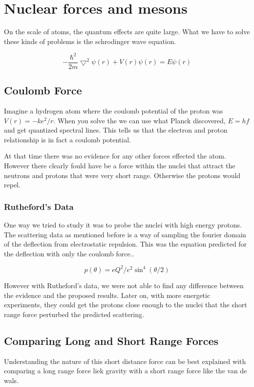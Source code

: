 \documentclass[english, 11pt]{article}
\begin{document}
      \section{Nuclear forces and mesons}

      On the scale of atoms, the quantum effects are quite large. What we have to solve these kinds of problems is the schrodinger wave equation.

      \begin{defn}\label{swe}
        \[ -\frac{\hbar^2}{2m}\bigtriangledown^2\psi(r) + V(r)\psi(r) = E\psi(r) \]
      \end{defn}

      \subsection{Coulomb Force}
        Imagine a hydrogen atom where the coulomb potential of the proton was $V(r) = -ke^2/r$. When you solve the  we can use what Planck discovered, $E=hf$ and get quantized spectral lines. This tells us that the electron and proton relationship is in fact a coulomb potential.

        At that time there was no evidence for any other forces effected the atom. However there clearly fould have be a force within the nuclei that attract the neutrons and protons that were very short range. Otherwise the protons would repel. 

      \subsubsection{Rutheford's Data}
        One way we tried to study it was to probe the nuclei with high energy protons. The scattering data as mentioned before is a way of sampling the fourier domain of the deflection from electrostatic repulsion. This was the equation predicted for the deflection with only the coulomb force..

          \[ p(\theta) = eQ^2 / e^2\sin^4(\theta/2) \]

        However with Rutheford's data, we were not able to find any difference between the evidence and the proposed results. Later on, with more energetic experiments, they could get the protons close enough to the nuclei that the short range force perturbed the predicted scattering.

      \subsection{Comparing Long and Short Range Forces}
        Understanding the nature of this short distance force can be best explained with comparing a long range force liek gravity with a short range force like the van de wals. 
\end{document}
